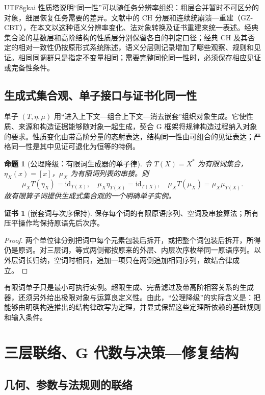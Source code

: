 \documentclass[11pt,a4paper]{article}
\theoremstyle{plain}
\newtheorem{proposition}[theorem]{命题}
\theoremstyle{definition}
\newtheorem*{certificate}{证书}
\theoremstyle{remark}
\begin{document}
\begin{CJK*}{UTF8}{gkai}
性质塔说明“同一性”可以随任务分辨率组织：粗层合并暂时不可区分的对象，细层恢复任务需要的差异。文献中的 CH 分层和连续统崩溃—重建（GZ-CBT），在本文以这种语义分辨率变化、法对象转换及证书重建来统一表述。经典集合论的基数层和高阶结构的性质层分别保留各自的判定口径；经典 CH 及其否定的相对一致性仍按原形式系统陈述，语义分层则记录增加了哪些观察、规则和见证。相同同调群只是指定不变量相同；需要完整同伦同一性时，必须保存相应见证或完备性条件。\cite{S01,S06,S10}

\subsection{生成式集合观、单子接口与证书化同一性}

单子 $(T,\eta,\mu)$ 用“进入上下文—组合上下文—消去嵌套”组织对象生成。它使性质、来源和构造证据能够随对象一起生成，契合 G 框架将规律构造过程纳入对象的要求。性质变化由带高阶分量的态射表达，结构同一性由可组合的见证表达；严格同一性是其中见证可退化为恒等的特例。\cite{S09,S10}

\begin{proposition}[公理降级：有限词生成器的单子律]
\label{fa:prop-monad}
令 $T(X)=X^*$ 为有限词集合，$\eta_X(x)=[x]$，$\mu_X$ 为有限词列表的串接。则
\[
 \mu_XT(\eta_X)=\mathrm{id}_{T(X)},\quad
 \mu_X\eta_{T(X)}=\mathrm{id}_{T(X)},\quad
 \mu_XT(\mu_X)=\mu_X\mu_{T(X)}.
\]
故有限算子词提供生成式集合观的一个明确单子实例。
\end{proposition}
\begin{certificate}[嵌套词与次序保持]
保存每个词的有限原语序列、空词及串接算法；所有压平操作均保持原语先后次序。
\end{certificate}
\begin{proof}
两个单位律分别把词中每个元素包装后拆开，或把整个词包装后拆开，所得仍是原词。对三层词，等式两侧都按原来的外层、内层次序枚举同一原语序列。以外层词长归纳，空词时相同，追加一项只在两侧追加相同序列，故结合律成立。
\end{proof}

有限词单子只是最小可执行实例。超限生成、完备滤过及带高阶相容关系的生成器，还须另外给出极限对象与运算良定义性。由此，“公理降级”的实际含义是：把能够由明确构造推出的结构律改写为定理，并显式保留这些定理所依赖的基础规则和输入条件。

\section{三层联络、G 代数与决策—修复结构}
\label{fa:algebra}

\subsection{几何、参数与法规则的联络}


\end{CJK*}
\end{document}
